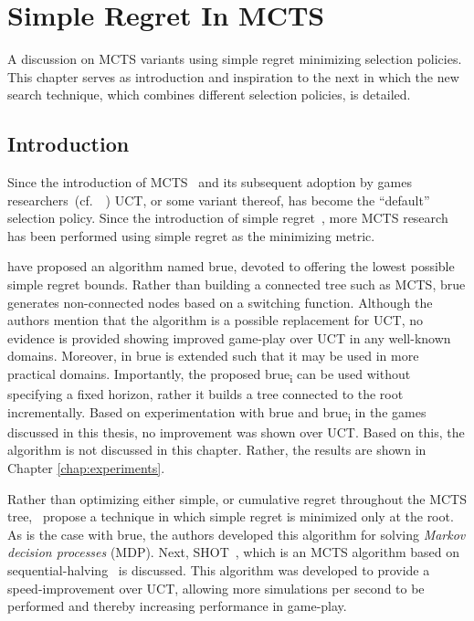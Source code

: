 \documentclass{kecsmstr}
\newcommand{\cf}{{cf.}~}
\begin{document}
\chapter{Simple Regret In MCTS}
\label{chap:mctssr}

\begin{chaptercontents} A discussion on MCTS variants using simple regret minimizing selection policies. This chapter serves as introduction and inspiration to the next in which the new search technique, which combines different selection policies, is detailed.
\end{chaptercontents}

\section{Introduction}
Since the introduction of MCTS~ and its subsequent adoption by games researchers~(\cf~) UCT, or some variant thereof, has become the ``default'' selection policy. Since the introduction of simple regret~, more MCTS research has been performed using simple regret as the minimizing metric.

 have proposed an algorithm named {\sc brue}, devoted to offering the lowest possible simple regret bounds. Rather than building a connected tree such as MCTS, {\sc brue} generates non-connected nodes based on a switching function. Although the authors mention that the algorithm is a possible replacement for UCT, no evidence is provided showing improved game-play over UCT in any well-known domains. Moreover, in  {\sc brue} is extended such that it may be used in more practical domains. Importantly, the proposed {\sc brue\textsubscript{i}} can be used without specifying a fixed horizon, rather it builds a tree connected to the root incrementally. Based on experimentation with {\sc brue} and {\sc brue\textsubscript{i}} in the games discussed in this thesis, no improvement was shown over UCT. Based on this, the algorithm is not discussed in this chapter. Rather, the results are shown in Chapter \ref{chap:experiments}.

Rather than optimizing either simple, or cumulative regret throughout the MCTS tree,~ propose a technique in which simple regret is minimized only at the root. As is the case with {\sc brue}, the authors developed this algorithm for solving \emph{Markov decision processes} (MDP). Next, SHOT~, which is an MCTS algorithm based on sequential-halving~ is discussed. This algorithm was developed to provide a speed-improvement over UCT, allowing more simulations per second to be performed and thereby increasing performance in game-play. 
\end{document}

